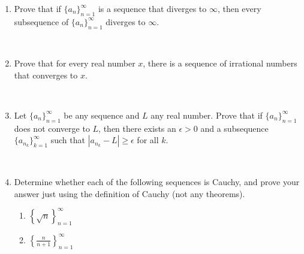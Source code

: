 \documentclass{amsart}
\def\e{\epsilon}
\begin{document}
\begin{enumerate}
\begin{enumerate}
	\end{enumerate}
	
	\
	
	\item Prove that if $\{a_n\}_{n=1}^{\infty}$ is a sequence that diverges to $\infty$, then every subsequence of $\{a_n\}_{n=1}^{\infty}$ diverges to $\infty$.
	
	\
	
	\item Prove that for every real number $x$, there is a sequence of irrational numbers that converges to $x$.
	
	\
	
		\item  Let $\{a_n\}_{n=1}^\infty$ be any sequence and $L$ any real
	number. 
	Prove that if $\{a_n\}_{n=1}^\infty$ does not converge to $L$,  then
	there exists an $\e > 0$ and a subsequence
	$\{a_{n_k}\}_{k=1}^\infty$ such that $|a_{n_k} - L| \geq \e$ for all $k$.

	
\

\item Determine whether each of the following sequences is Cauchy, and prove your answer just using the definition of Cauchy (not any theorems).
	\begin{enumerate}
		
		
			\item $\left\{ \sqrt{n}  \right\}_{n=1}^\infty$
			
			
		\item $\left\{  \frac{n}{n+1}   \right\}_{n=1}^\infty$
		
	
		
	\end{enumerate}


\end{enumerate}
\end{document}

